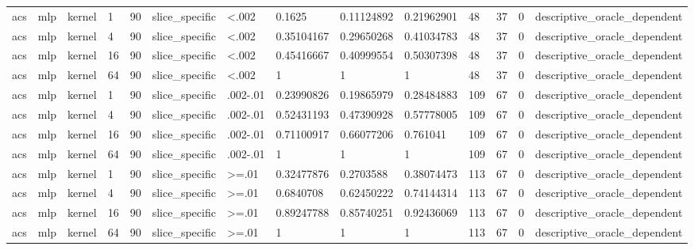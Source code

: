 \begin{tabular}{llllllllllllll}
acs & mlp & kernel & 1 & 90 & slice\_specific & <.002 & 0.1625 & 0.11124892 & 0.21962901 & 48 & 37 & 0 & descriptive\_oracle\_dependent \\
acs & mlp & kernel & 4 & 90 & slice\_specific & <.002 & 0.35104167 & 0.29650268 & 0.41034783 & 48 & 37 & 0 & descriptive\_oracle\_dependent \\
acs & mlp & kernel & 16 & 90 & slice\_specific & <.002 & 0.45416667 & 0.40999554 & 0.50307398 & 48 & 37 & 0 & descriptive\_oracle\_dependent \\
acs & mlp & kernel & 64 & 90 & slice\_specific & <.002 & 1 & 1 & 1 & 48 & 37 & 0 & descriptive\_oracle\_dependent \\
acs & mlp & kernel & 1 & 90 & slice\_specific & .002-.01 & 0.23990826 & 0.19865979 & 0.28484883 & 109 & 67 & 0 & descriptive\_oracle\_dependent \\
acs & mlp & kernel & 4 & 90 & slice\_specific & .002-.01 & 0.52431193 & 0.47390928 & 0.57778005 & 109 & 67 & 0 & descriptive\_oracle\_dependent \\
acs & mlp & kernel & 16 & 90 & slice\_specific & .002-.01 & 0.71100917 & 0.66077206 & 0.761041 & 109 & 67 & 0 & descriptive\_oracle\_dependent \\
acs & mlp & kernel & 64 & 90 & slice\_specific & .002-.01 & 1 & 1 & 1 & 109 & 67 & 0 & descriptive\_oracle\_dependent \\
acs & mlp & kernel & 1 & 90 & slice\_specific & >=.01 & 0.32477876 & 0.2703588 & 0.38074473 & 113 & 67 & 0 & descriptive\_oracle\_dependent \\
acs & mlp & kernel & 4 & 90 & slice\_specific & >=.01 & 0.6840708 & 0.62450222 & 0.74144314 & 113 & 67 & 0 & descriptive\_oracle\_dependent \\
acs & mlp & kernel & 16 & 90 & slice\_specific & >=.01 & 0.89247788 & 0.85740251 & 0.92436069 & 113 & 67 & 0 & descriptive\_oracle\_dependent \\
acs & mlp & kernel & 64 & 90 & slice\_specific & >=.01 & 1 & 1 & 1 & 113 & 67 & 0 & descriptive\_oracle\_dependent \\
\bottomrule
\end{tabular}
